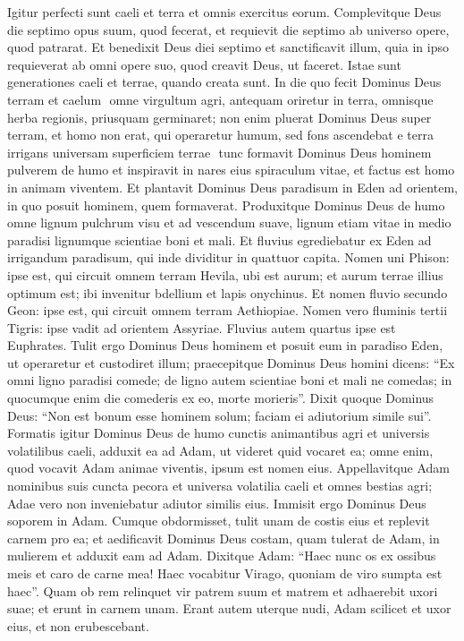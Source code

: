 \begin{biblechapter}  
\verse Igitur perfecti sunt caeli et terra et omnis exercitus eorum. 
\verse Complevitque Deus die septimo opus suum, quod fecerat, et requievit die septimo ab universo opere, quod patrarat. 
\verse Et benedixit Deus diei septimo et sanctificavit illum, quia in ipso requieverat ab omni opere suo, quod creavit Deus, ut faceret. 
\verse Istae sunt generationes caeli et terrae, quando creata sunt. In die quo fecit Dominus Deus terram et caelum ­ 
\verse omne virgultum agri, antequam oriretur in terra, omnisque herba regionis, priusquam germinaret; non enim pluerat Dominus Deus super terram, et homo non erat, qui operaretur humum,  
\verse sed fons ascendebat e terra irrigans universam superficiem terrae ­ 
\verse tunc formavit Dominus Deus hominem pulverem de humo et inspiravit in nares eius spiraculum vitae, et factus est homo in animam viventem. 
\verse Et plantavit Dominus Deus paradisum in Eden ad orientem, in quo posuit hominem, quem formaverat. 
\verse Produxitque Dominus Deus de humo omne lignum pulchrum visu et ad vescendum suave, lignum etiam vitae in medio paradisi lignumque scientiae boni et mali. 
\verse Et fluvius egrediebatur ex Eden ad irrigandum paradisum, qui inde dividitur in quattuor capita. 
\verse Nomen uni Phison: ipse est, qui circuit omnem terram Hevila, ubi est aurum; 
\verse et aurum terrae illius optimum est; ibi invenitur bdellium et lapis onychinus. 
\verse Et nomen fluvio secundo Geon: ipse est, qui circuit omnem terram Aethiopiae. 
\verse Nomen vero fluminis tertii Tigris: ipse vadit ad orientem Assyriae. Fluvius autem quartus ipse est Euphrates. 
\verse Tulit ergo Dominus Deus hominem et posuit eum in paradiso Eden, ut operaretur et custodiret illum; 
\verse praecepitque Dominus Deus homini dicens: “Ex omni ligno paradisi comede; 
\verse de ligno autem scientiae boni et mali ne comedas; in quocumque enim die comederis ex eo, morte morieris”. 
\verse Dixit quoque Dominus Deus: “Non est bonum esse hominem solum; faciam ei adiutorium simile sui”. 
\verse Formatis igitur Dominus Deus de humo cunctis animantibus agri et universis volatilibus caeli, adduxit ea ad Adam, ut videret quid vocaret ea; omne enim, quod vocavit Adam animae viventis, ipsum est nomen eius. 
\verse Appellavitque Adam nominibus suis cuncta pecora et universa volatilia caeli et omnes bestias agri; Adae vero non inveniebatur adiutor similis eius. 
\verse Immisit ergo Dominus Deus soporem in Adam. Cumque obdormisset, tulit unam de costis eius et replevit carnem pro ea; 
\verse et aedificavit Dominus Deus costam, quam tulerat de Adam, in mulierem et adduxit eam ad Adam. 
\verse Dixitque Adam: “Haec nunc os ex ossibus meis et caro de carne mea! Haec vocabitur Virago, quoniam de viro sumpta est haec”. 
\verse Quam ob rem relinquet vir patrem suum et matrem et adhaerebit uxori suae; et erunt in carnem unam. 
\verse Erant autem uterque nudi, Adam scilicet et uxor eius, et non erubescebant. 
\end{biblechapter}

